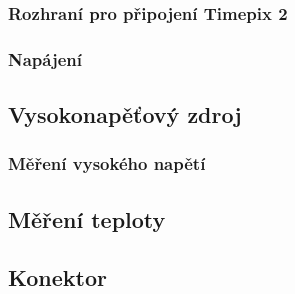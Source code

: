 		\subsubsection{Rozhraní pro připojení Timepix 2}	%
		\subsubsection{Napájení}	%
	\subsection{Vysokonapěťový zdroj}	%
		\subsubsection{Měření vysokého napětí} %
	\subsection{Měření teploty}	%
	\label{Mereni teploty}
	\subsection{Konektor}	%
	\label{konektor}
